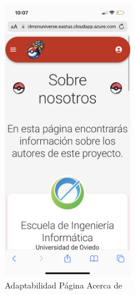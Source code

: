 \begin{figure}[H]
    \centering
    \includegraphics[width=0.5\textwidth]{figures/adaptabilidad/about.png}
    \caption{Adaptabilidad Página Acerca de}
    \label{fig:Adap-Acerca}
\end{figure}

